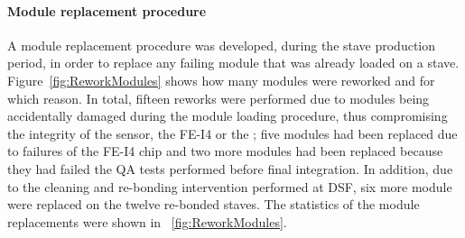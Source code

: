 \paragraph{Module replacement procedure}
\label{subsec:ModReplacement}
A module replacement procedure was developed, during the stave production period, in order to replace any failing module that was already loaded on a stave. Figure~\ref{fig:ReworkModules} shows how many modules were reworked and for which reason.
In total, fifteen reworks were performed due to modules being accidentally damaged during the module loading procedure, thus compromising the integrity of the sensor, the FE-I4 or the \moduleflex; five modules had been replaced due to failures of the FE-I4 chip and two more modules had been replaced because they had failed the QA tests performed before final integration.
In addition, due to the cleaning and re-bonding intervention performed at DSF, six more module were replaced on the twelve re-bonded staves.
The statistics of the module replacements were shown in ~\ref{fig:ReworkModules}.

